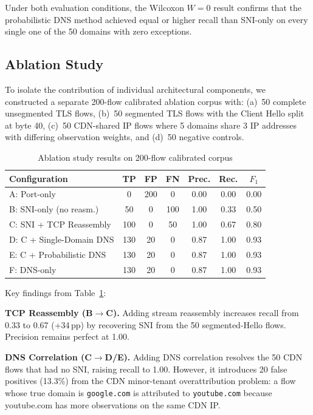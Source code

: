 \documentclass[conference]{IEEEtran}
\begin{document}
Under both evaluation conditions, the Wilcoxon $W = 0$ result confirms
that the probabilistic DNS method achieved equal or higher recall
than SNI-only on every single one of the 50 domains with zero exceptions.

\subsection{Ablation Study}
\label{sec:ablation}

To isolate the contribution of individual architectural components,
we constructed a separate 200-flow calibrated ablation corpus with:
(a)~50 complete unsegmented TLS flows, (b)~50 segmented TLS flows
with the Client Hello split at byte 40, (c)~50 CDN-shared IP flows
where 5 domains share 3 IP addresses with differing observation weights,
and (d)~50 negative controls.

\begin{table}[!t]
\centering
\caption{Ablation study results on 200-flow calibrated corpus}
\label{tab:ablation}
\scriptsize
\setlength{\tabcolsep}{2pt}
\begin{tabular}{|p{3.0cm}|c|c|c|c|c|c|}
\hline
\textbf{Configuration} & \textbf{TP} & \textbf{FP} & \textbf{FN} & \textbf{Prec.} & \textbf{Rec.} & \textbf{$F_1$} \\
\hline
A: Port-only & 0 & 200 & 0 & 0.00 & 0.00 & 0.00 \\
\hline
B: SNI-only (no reasm.) & 50 & 0 & 100 & 1.00 & 0.33 & 0.50 \\
\hline
C: SNI + TCP Reassembly & 100 & 0 & 50 & 1.00 & 0.67 & 0.80 \\
\hline
D: C + Single-Domain DNS & 130 & 20 & 0 & 0.87 & 1.00 & 0.93 \\
\hline
E: C + Probabilistic DNS & 130 & 20 & 0 & 0.87 & 1.00 & 0.93 \\
\hline
F: DNS-only & 130 & 20 & 0 & 0.87 & 1.00 & 0.93 \\
\hline
\end{tabular}
\end{table}

Key findings from Table~\ref{tab:ablation}:

\textbf{TCP Reassembly (B$\to$C).} Adding stream reassembly increases
recall from 0.33 to 0.67 (+34\,pp) by recovering SNI from the 50
segmented-Hello flows.  Precision remains perfect at 1.00.

\textbf{DNS Correlation (C$\to$D/E).} Adding DNS correlation resolves
the 50 CDN flows that had no SNI, raising recall to 1.00.
However, it introduces 20 false positives (13.3\%) from the CDN
minor-tenant overattribution problem: a flow whose true domain is
\texttt{google.com} is attributed to \texttt{youtube.com} because
youtube.com has more observations on the same CDN IP.
\end{document}
